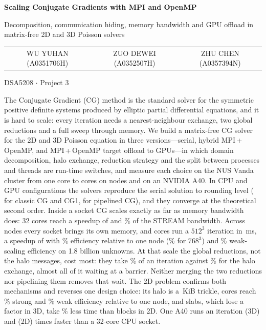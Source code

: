 \documentclass[10pt,a4paper]{article}
\begin{document}
\thispagestyle{plain}
\begin{center}
{\LARGE\bfseries Scaling Conjugate Gradients with MPI and OpenMP\par}
\vspace{4pt}
{\large Decomposition, communication hiding, memory bandwidth and GPU offload in matrix-free 2D and 3D Poisson solvers\par}
\vspace{10pt}
\begin{tabular*}{\linewidth}{@{\extracolsep{\fill}}ccc}
WU YUHAN (A0351706H) & ZUO DEWEI (A0352507H) & ZHU CHEN (A0357394N)
\end{tabular*}\par
\vspace{6pt}
DSA5208 $\cdot$ Project 3\par
\end{center}
\vspace{4pt}

\par
\noindent
The Conjugate Gradient (CG) method is the standard solver for the symmetric positive definite systems
produced by elliptic partial differential equations, and it is hard to scale: every iteration
needs a nearest-neighbour exchange, two global reductions and a full sweep through memory. We build a
matrix-free CG solver for the 2D and 3D Poisson equation in three versions---serial, hybrid MPI\,+\,OpenMP, and
MPI\,+\,OpenMP target offload to GPUs---in which domain decomposition, halo exchange, reduction strategy and
the split between processes and threads are run-time switches, and measure each choice on the NUS Vanda
cluster from one core to \Pmax{} cores on \NodesMax{} nodes and on an NVIDIA A40. In \ValRuns{} CPU and
\GpuValRuns{} GPU configurations the solvers reproduce the serial solution to rounding level (\ValWorstCG{}
for classic CG and CG1, \ValWorstPipe{} for pipelined CG), and they converge at the theoretical second
order. Inside a socket CG scales exactly as far as memory bandwidth does: 32 cores
reach a speedup of \SpeedupNode{} and \CGbwFrac\% of the STREAM bandwidth. Across nodes every socket
brings its own memory, and \Pmax{} cores run a $512^3$ iteration in \TiterPmax\,ms, a speedup of
\SpeedupPmax{} with \NodeEffPmax\% efficiency relative to one node (\NodeEffTwoPmax\% for $768^3$) and
\WeakNodeEff\% weak-scaling efficiency on 1.8 billion unknowns. At that scale the global reductions, not the
halo messages, cost most: they take \RedFracPmax\% of an iteration against \HaloFracPmax\% for the halo
exchange, almost all of it waiting at a barrier. Neither merging the two reductions nor pipelining them
removes that wait. The 2D problem confirms both mechanisms and reverses one design choice: its halo is a
\TwoHaloKiBMax\,KiB trickle, \Pmax{} cores reach \TwoNodeEffMax\% strong and \TwoWeakNodeEff\% weak
efficiency relative to one node, and slabs, which lose a factor \RelOneD{} in 3D, take \TwoSlabPct\%
less time than blocks in 2D. One A40 runs an iteration \GpuVsSocket{} (3D) and \GpuTwoVsSocket{} (2D) times
faster than a 32-core CPU socket.
\end{document}
